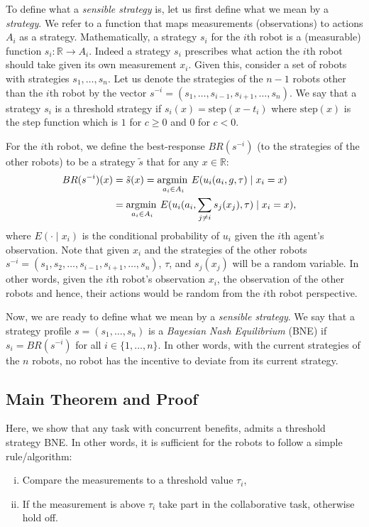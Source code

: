 \documentclass[conference]{ieeeconf}
\DeclareMathOperator*{\argmax}{\arg\!\min\>}
\def\R{\mathbb{R}}
\begin{document}
To define what a \textit{sensible strategy} is, let us first define what we mean by a \textit{strategy}. We refer to a function that maps measurements (observations) to actions $A_i$ as a strategy. Mathematically, a strategy $s_i$ for the $i$th robot is a (measurable) function $s_i:\R\to A_i$. Indeed a strategy $s_i$ prescribes what action the $i$th robot should take given its own measurement $x_i$. Given this, consider a set of robots with strategies $s_1,\ldots,s_n$. Let us denote the strategies of the $n-1$ robots other than the $i$th robot by the vector $s^{-i}=(s_1,\ldots,s_{i-1},s_{i+1},\ldots,s_n)$.  We say that a strategy $s_i$ is a threshold strategy if $s_i(x)=\text{step}(x-t_i)$ where $\text{step}(x)$ is the step function which is $1$ for $c\geq 0$ and $0$ for $c<0$.


For the $i$th robot, we define the best-response $BR(s^{-i})$ (to the strategies of the other robots) to be a strategy $\tilde{s}$ that for any $x\in \R$: 
\begin{align}\label{eqn:BR}
BR(s^{-i})(x)&=\tilde{s}(x)=\argmax_{a_i\in A_i} E(u_i(a_i,g,\tau)\mid x_i=x)\cr 
&=\argmax_{a_i\in A_i} E(u_i(a_i,\sum_{j\not=i}s_j(x_j),\tau)\mid x_i=x),
\end{align}
where $E(\cdot \mid x_i)$ is the conditional probability of $u_i$ given the $i$th agent's observation. Note that given $x_i$ and the strategies of the other robots $s^{-i}=(s_1,s_2,\ldots,s_{i-1},s_{i+1},\ldots,s_n)$, $\tau$, and $s_j(x_j)$ will be a random variable. In other words, given the $i$th robot's observation $x_i$, the observation of the other robots and hence, their actions would be random from the $i$th robot perspective.


Now, we are ready to define what we mean by a \textit{sensible strategy}. We say that a strategy profile $s=(s_1,\ldots,s_n)$ is a \textit{Bayesian Nash Equilibrium} (BNE) \cite{fudenberg1998theory} if $s_i=BR(s^{-i})$ for all $i\in \{1,\ldots,n\}$. In other words, with the current strategies of the $n$ robots, no robot has the incentive to deviate from its current strategy.

\subsection{Main Theorem and Proof}\label{sec:thmproof}
Here, we show that any task with concurrent benefits, admits a threshold strategy BNE. In other words, it is sufficient for the robots to follow a simple rule/algorithm: 
\begin{enumerate}[(i)]
\item Compare the measurements to a threshold value $\tau_i$,
\item If the measurement is above $\tau_i$ take part in the collaborative task, otherwise hold off. 
\end{enumerate}
\end{document}
